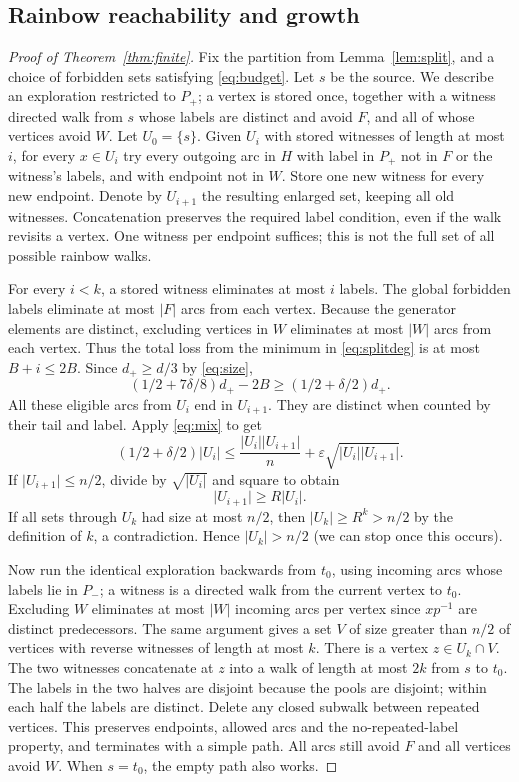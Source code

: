 \documentclass[11pt]{article}
\theoremstyle{remark}\newtheorem{remark}[theorem]{Remark}
\newcommand{\abs}[1]{\lvert#1\rvert}
\newcommand{\ee}{\varepsilon}
\begin{document}
\subsection{Rainbow reachability and growth}
\begin{proof}[Proof of Theorem~\ref{thm:finite}]
Fix the partition from Lemma~\ref{lem:split}, and a choice of forbidden sets satisfying \eqref{eq:budget}. Let $s$ be the source. We describe an exploration restricted to $P_+$; a vertex is stored once, together with a witness directed walk from $s$ whose labels are distinct and avoid $F$, and all of whose vertices avoid $W$. Let $U_0=\{s\}$. Given $U_i$ with stored witnesses of length at most $i$, for every $x\in U_i$ try every outgoing arc in $H$ with label in $P_+$ not in $F$ or the witness's labels, and with endpoint not in $W$. Store one new witness for every new endpoint. Denote by $U_{i+1}$ the resulting enlarged set, keeping all old witnesses. Concatenation preserves the required label condition, even if the walk revisits a vertex. One witness per endpoint suffices; this is not the full set of all possible rainbow walks.

For every $i<k$, a stored witness eliminates at most $i$ labels. The global forbidden labels eliminate at most $\abs F$ arcs from each vertex. Because the generator elements are distinct, excluding vertices in $W$ eliminates at most $\abs W$ arcs from each vertex. Thus the total loss from the minimum in \eqref{eq:splitdeg} is at most $B+i\le2B$. Since $d_+\ge d/3$ by \eqref{eq:size},
\begin{equation}\label{eq:remaining}
 (1/2+7\delta/8)d_+-2B\ge(1/2+\delta/2)d_+.
\end{equation}
All these eligible arcs from $U_i$ end in $U_{i+1}$. They are distinct when counted by their tail and label. Apply \eqref{eq:mix} to get
\[
 (1/2+\delta/2)\abs{U_i}
 \le \frac{\abs{U_i}\abs{U_{i+1}}}{n}
     +\ee\sqrt{\abs{U_i}\abs{U_{i+1}}}.
\]
If $\abs{U_{i+1}}\le n/2$, divide by $\sqrt{\abs{U_i}}$ and square to obtain
\begin{equation}\label{eq:grow}
 \abs{U_{i+1}}\ge R\abs{U_i}.
\end{equation}
If all sets through $U_k$ had size at most $n/2$, then $\abs{U_k}\ge R^k>n/2$ by the definition of $k$, a contradiction. Hence $\abs{U_k}>n/2$ (we can stop once this occurs).

Now run the identical exploration backwards from $t_0$, using incoming arcs whose labels lie in $P_-$; a witness is a directed walk from the current vertex to $t_0$. Excluding $W$ eliminates at most $\abs W$ incoming arcs per vertex since $x p^{-1}$ are distinct predecessors. The same argument gives a set $V$ of size greater than $n/2$ of vertices with reverse witnesses of length at most $k$. There is a vertex $z\in U_k\cap V$. The two witnesses concatenate at $z$ into a walk of length at most $2k$ from $s$ to $t_0$. The labels in the two halves are disjoint because the pools are disjoint; within each half the labels are distinct. Delete any closed subwalk between repeated vertices. This preserves endpoints, allowed arcs and the no-repeated-label property, and terminates with a simple path. All arcs still avoid $F$ and all vertices avoid $W$. When $s=t_0$, the empty path also works.


\end{proof}
\end{document}
